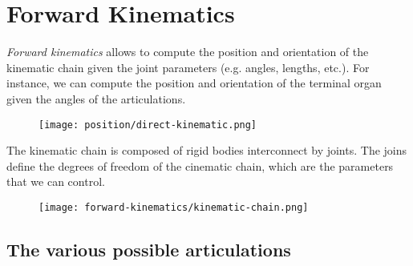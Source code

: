 \section{Forward Kinematics}
\emph{Forward kinematics} allows to compute the position and orientation of the kinematic chain given the joint parameters (e.g. angles, lengths, etc.). For instance, we can compute the position and orientation of the terminal organ given the angles of the articulations.
\begin{figure}[H]
    \centering
    \texttt{[image: position/direct-kinematic.png]}
\end{figure}

The kinematic chain is composed of rigid bodies interconnect by joints. The joins define the degrees of freedom of the cinematic chain, which are the parameters that we can control.
\begin{figure}[H]
    \centering
    \texttt{[image: forward-kinematics/kinematic-chain.png]}
\end{figure}

\subsection{The various possible articulations}